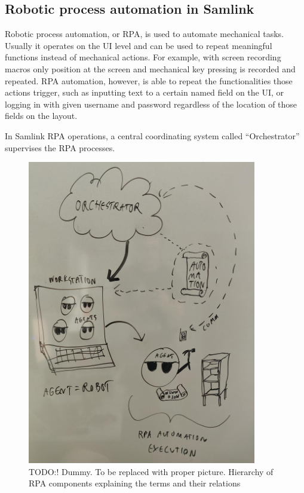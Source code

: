 
\subsection{Robotic process automation in Samlink}\label{subsec:bg-rpa-in-samlink}

Robotic process automation, or RPA,
is used to automate mechanical tasks.
Usually it operates on the UI level
and can be used to repeat meaningful functions
instead of mechanical actions.
For example, with screen recording macros
only position at the screen and mechanical key pressing is recorded and repeated.
RPA automation, however,
is able to repeat the functionalities those actions trigger,
such as inputting text to a certain named field on the UI,
or logging in with given username and password
regardless of the location of those fields on the layout.


In Samlink RPA operations,
a central coordinating system called \enquote{Orchestrator}
supervises the RPA processes.


\begin{figure}[htb]
    \centering
    \includegraphics[width=100mm,angle=270]{./appendices/rpa-hierarchy}
    \caption{TODO:! Dummy. To be replaced with proper picture.
    Hierarchy of RPA components explaining the terms and their relations
        \label{fig:rpa-hierarchy}}
\end{figure}



